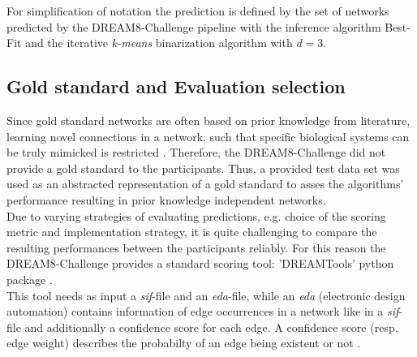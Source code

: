 For simplification of notation the prediction is defined by the set of networks predicted by the DREAM8-Challenge pipeline with the inference algorithm Best-Fit and the iterative \textit{k-means} binarization algorithm with $d=3$.


\subsection*{Gold standard and Evaluation selection}
Since gold standard networks are often based on prior knowledge from literature, learning novel connections in a network, such that specific biological systems can be truly mimicked is restricted \citep{Hill.2016}. Therefore, the DREAM8-Challenge did not provide a gold standard to the participants. Thus, a provided test data set was used as an abstracted representation of a gold standard to asses the algorithms' performance resulting in prior knowledge independent networks. \\

Due to varying strategies of evaluating predictions, e.g. choice of the scoring metric and implementation strategy, it is quite challenging to compare the resulting performances between the participants reliably. For this reason the DREAM8-Challenge provides a standard scoring tool: 'DREAMTools' python package \citep{Cokelaer.2015}.\\
This tool needs as input a \textit{sif}-file and an \textit{eda}-file, while an \textit{eda} (electronic design automation) contains information of edge occurrences in a network like in a \textit{sif}-file and additionally a confidence score for each edge. A confidence score (resp. edge weight) describes the probabilty of an edge being existent or not \citep{authornamenotavailable.}.\\ 

